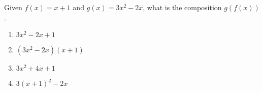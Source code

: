 \bigskip

\item Given $f(x) = x+1$ and $g(x) = 3 x^2 - 2x$, what is the composition $g(f(x))$.

\begin{enumerate}
\item $3 x^2 - 2x + 1$
\item $(3 x^2 - 2x)(x+1)$
\item $3 x^2 + 4x + 1$
\item $3 (x+1)^2 - 2x$
\end{enumerate}

